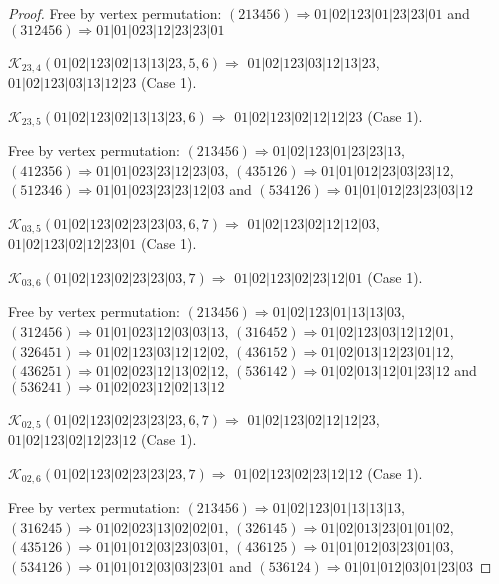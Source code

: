 \documentclass[12pt]{article}
\theoremstyle{plain}
\theoremstyle{definition}
\theoremstyle{remark}
\newcommand{\fancy}[1]{\mathcal{#1}}
\def\K{\fancy{K}}
\begin{document}
\begin{proof}
	
	
	Free by vertex permutation: $(2 1 3 4 5 6)\Rightarrow 01|02|123|01|23|23|01$ and $(3 1 2 4 5 6)\Rightarrow 01|01|023|12|23|23|01$
	
	
	
	\bigskip
	
	$\K_{23,4}(01|02|123|02|13|13|23,5, 6)\Rightarrow $ $01|02|123|03|12|13|23$, $01|02|123|03|13|12|23$ (Case 1).
	
	$\K_{23,5}(01|02|123|02|13|13|23,6)\Rightarrow $ $01|02|123|02|12|12|23$ (Case 1).
	
	
	
	Free by vertex permutation: $(2 1 3 4 5 6)\Rightarrow 01|02|123|01|23|23|13$, $(4 1 2 3 5 6)\Rightarrow 01|01|023|23|12|23|03$, $(4 3 5 1 2 6)\Rightarrow 01|01|012|23|03|23|12$, $(5 1 2 3 4 6)\Rightarrow 01|01|023|23|23|12|03$ and $(5 3 4 1 2 6)\Rightarrow 01|01|012|23|23|03|12$
	
	
	
	\bigskip
	
	$\K_{03,5}(01|02|123|02|23|23|03,6, 7)\Rightarrow $ $01|02|123|02|12|12|03$, $01|02|123|02|12|23|01$ (Case 1).
	
	$\K_{03,6}(01|02|123|02|23|23|03,7)\Rightarrow $ $01|02|123|02|23|12|01$ (Case 1).
	
	
	
	Free by vertex permutation: $(2 1 3 4 5 6)\Rightarrow 01|02|123|01|13|13|03$, $(3 1 2 4 5 6)\Rightarrow 01|01|023|12|03|03|13$, $(3 1 6 4 5 2)\Rightarrow 01|02|123|03|12|12|01$, $(3 2 6 4 5 1)\Rightarrow 01|02|123|03|12|12|02$, $(4 3 6 1 5 2)\Rightarrow 01|02|013|12|23|01|12$, $(4 3 6 2 5 1)\Rightarrow 01|02|023|12|13|02|12$, $(5 3 6 1 4 2)\Rightarrow 01|02|013|12|01|23|12$ and $(5 3 6 2 4 1)\Rightarrow 01|02|023|12|02|13|12$
	
	
	
	\bigskip
	
	$\K_{02,5}(01|02|123|02|23|23|23,6, 7)\Rightarrow $ $01|02|123|02|12|12|23$, $01|02|123|02|12|23|12$ (Case 1).
	
	$\K_{02,6}(01|02|123|02|23|23|23,7)\Rightarrow $ $01|02|123|02|23|12|12$ (Case 1).
	
	
	
	Free by vertex permutation: $(2 1 3 4 5 6)\Rightarrow 01|02|123|01|13|13|13$, $(3 1 6 2 4 5)\Rightarrow 01|02|023|13|02|02|01$, $(3 2 6 1 4 5)\Rightarrow 01|02|013|23|01|01|02$, $(4 3 5 1 2 6)\Rightarrow 01|01|012|03|23|03|01$, $(4 3 6 1 2 5)\Rightarrow 01|01|012|03|23|01|03$, $(5 3 4 1 2 6)\Rightarrow 01|01|012|03|03|23|01$ and $(5 3 6 1 2 4)\Rightarrow 01|01|012|03|01|23|03$
	

\end{proof}
\end{document}
